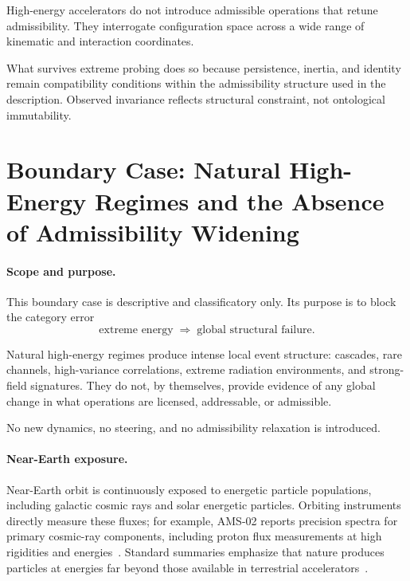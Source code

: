 \documentclass[aps,prx,onecolumn,11pt]{revtex4-2}
\theoremstyle{plain}
\theoremstyle{definition}
\theoremstyle{remark}
\begin{document}
High-energy accelerators do not introduce admissible operations that
retune admissibility. They interrogate configuration space across a
wide range of kinematic and interaction coordinates.

What survives extreme probing does so because persistence, inertia, and
identity remain compatibility conditions within the admissibility
structure used in the description. Observed invariance reflects
structural constraint, not ontological immutability.

\section{Boundary Case: Natural High-Energy Regimes and the Absence of Admissibility Widening}
\label{app:boundary_natural_high_energy}

\paragraph{Scope and purpose.}

This boundary case is descriptive and classificatory only. Its purpose
is to block the category error
\[
\text{extreme energy}
\;\Longrightarrow\;
\text{global structural failure}.
\]

Natural high-energy regimes produce intense local event structure:
cascades, rare channels, high-variance correlations, extreme
radiation environments, and strong-field signatures. They do not, by
themselves, provide evidence of any global change in what operations
are licensed, addressable, or admissible.

No new dynamics, no steering, and no admissibility relaxation is
introduced.

\paragraph{Near-Earth exposure.}

Near-Earth orbit is continuously exposed to energetic particle
populations, including galactic cosmic rays and solar energetic
particles. Orbiting instruments directly measure these fluxes; for
example, AMS-02 reports precision spectra for primary cosmic-ray
components, including proton flux measurements at high rigidities and
energies~\cite{Consolandi2014AMSProton}. Standard summaries emphasize
that nature produces particles at energies far beyond those available
in terrestrial accelerators~\cite{PDG2025CosmicRays,GaisserEngelResconi2016}.
\end{document}
